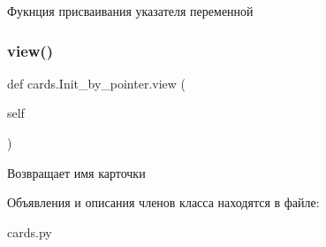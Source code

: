 Фукнция присваивания указателя переменной 

\mbox{\label{classcards_1_1_init__by__pointer_aabff065a7cad9e51f1c7c2938f750dc0}} 
\subsubsection{\texorpdfstring{view()}{view()}}
{\footnotesize\ttfamily def cards.\+Init\+\_\+by\+\_\+pointer.\+view (\begin{DoxyParamCaption}\item[{}]{self }\end{DoxyParamCaption})}



Возвращает имя карточки 



Объявления и описания членов класса находятся в файле\+:\begin{DoxyCompactItemize}
\item 
cards.\+py\end{DoxyCompactItemize}
